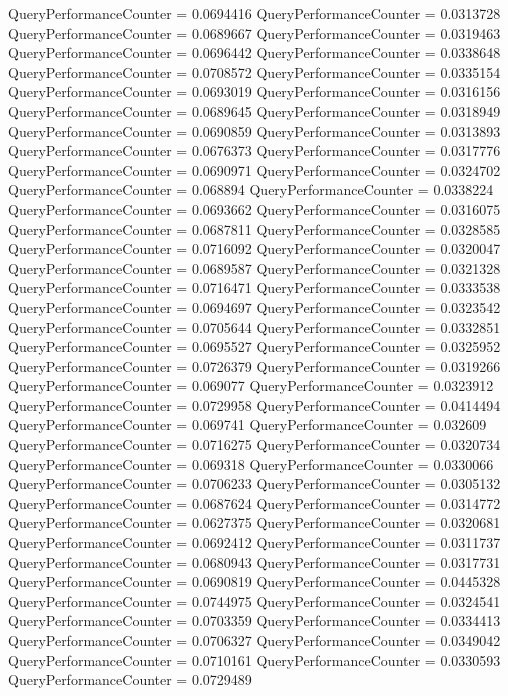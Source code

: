 \documentclass[9pt]{article}
\theoremstyle{plain}
\theoremstyle{definition}
\theoremstyle{remark}
\numberwithin{equation}{section}
\begin{document}
QueryPerformanceCounter  =  0.0694416
QueryPerformanceCounter  =  0.0313728
QueryPerformanceCounter  =  0.0689667
QueryPerformanceCounter  =  0.0319463
QueryPerformanceCounter  =  0.0696442
QueryPerformanceCounter  =  0.0338648
QueryPerformanceCounter  =  0.0708572
QueryPerformanceCounter  =  0.0335154
QueryPerformanceCounter  =  0.0693019
QueryPerformanceCounter  =  0.0316156
QueryPerformanceCounter  =  0.0689645
QueryPerformanceCounter  =  0.0318949
QueryPerformanceCounter  =  0.0690859
QueryPerformanceCounter  =  0.0313893
QueryPerformanceCounter  =  0.0676373
QueryPerformanceCounter  =  0.0317776
QueryPerformanceCounter  =  0.0690971
QueryPerformanceCounter  =  0.0324702
QueryPerformanceCounter  =  0.068894
QueryPerformanceCounter  =  0.0338224
QueryPerformanceCounter  =  0.0693662
QueryPerformanceCounter  =  0.0316075
QueryPerformanceCounter  =  0.0687811
QueryPerformanceCounter  =  0.0328585
QueryPerformanceCounter  =  0.0716092
QueryPerformanceCounter  =  0.0320047
QueryPerformanceCounter  =  0.0689587
QueryPerformanceCounter  =  0.0321328
QueryPerformanceCounter  =  0.0716471
QueryPerformanceCounter  =  0.0333538
QueryPerformanceCounter  =  0.0694697
QueryPerformanceCounter  =  0.0323542
QueryPerformanceCounter  =  0.0705644
QueryPerformanceCounter  =  0.0332851
QueryPerformanceCounter  =  0.0695527
QueryPerformanceCounter  =  0.0325952
QueryPerformanceCounter  =  0.0726379
QueryPerformanceCounter  =  0.0319266
QueryPerformanceCounter  =  0.069077
QueryPerformanceCounter  =  0.0323912
QueryPerformanceCounter  =  0.0729958
QueryPerformanceCounter  =  0.0414494
QueryPerformanceCounter  =  0.069741
QueryPerformanceCounter  =  0.032609
QueryPerformanceCounter  =  0.0716275
QueryPerformanceCounter  =  0.0320734
QueryPerformanceCounter  =  0.069318
QueryPerformanceCounter  =  0.0330066
QueryPerformanceCounter  =  0.0706233
QueryPerformanceCounter  =  0.0305132
QueryPerformanceCounter  =  0.0687624
QueryPerformanceCounter  =  0.0314772
QueryPerformanceCounter  =  0.0627375
QueryPerformanceCounter  =  0.0320681
QueryPerformanceCounter  =  0.0692412
QueryPerformanceCounter  =  0.0311737
QueryPerformanceCounter  =  0.0680943
QueryPerformanceCounter  =  0.0317731
QueryPerformanceCounter  =  0.0690819
QueryPerformanceCounter  =  0.0445328
QueryPerformanceCounter  =  0.0744975
QueryPerformanceCounter  =  0.0324541
QueryPerformanceCounter  =  0.0703359
QueryPerformanceCounter  =  0.0334413
QueryPerformanceCounter  =  0.0706327
QueryPerformanceCounter  =  0.0349042
QueryPerformanceCounter  =  0.0710161
QueryPerformanceCounter  =  0.0330593
QueryPerformanceCounter  =  0.0729489
\end{document}
